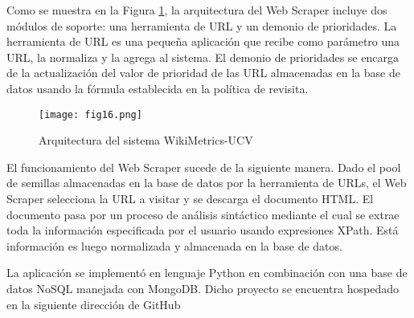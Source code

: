 Como se muestra en la Figura \ref{fig16}, la arquitectura del Web Scraper incluye dos módulos de soporte: una herramienta de URL y un demonio de prioridades. La herramienta de URL es una pequeña aplicación que recibe como parámetro una URL, la normaliza y la agrega al sistema. El demonio de prioridades se encarga de la actualización del valor de prioridad de las URL almacenadas en la base de datos usando la fórmula establecida en la política de revisita.

\begin{figure}[ht]
  \centering
  \texttt{[image: fig16.png]}
  \caption{Arquitectura del sistema WikiMetrics-UCV}
  \label{fig16}
\end{figure}

El funcionamiento del Web Scraper sucede de la siguiente manera. Dado el pool de semillas almacenadas en la base de datos por la herramienta de URLs, el Web Scraper selecciona la URL a visitar y se descarga el documento HTML. El documento pasa por un proceso de análisis sintáctico mediante el cual se extrae toda la información especificada por el usuario usando expresiones XPath. Está información es luego normalizada y almacenada en la base de datos.

La aplicación se implementó en lenguaje Python en combinación con una base de datos NoSQL manejada con MongoDB. Dicho proyecto se encuentra hospedado en la siguiente dirección de GitHub %

